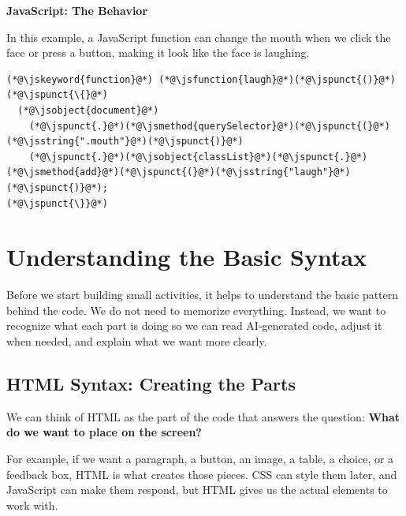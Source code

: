 \documentclass{article}
\begin{document}
\hfill
\begin{minipage}[t]{0.31\textwidth}
  \textbf{\Bitter\textcolor{naranja}{JavaScript: The Behavior}}

  \vspace{0.15cm}

  In this example, a JavaScript function can change the mouth when we click the face or press a button, making it look like the face is laughing.

  \vspace{0.2cm}

  \begin{lstlisting}
(*@\jskeyword{function}@*) (*@\jsfunction{laugh}@*)(*@\jspunct{()}@*) (*@\jspunct{\{}@*)
  (*@\jsobject{document}@*)
    (*@\jspunct{.}@*)(*@\jsmethod{querySelector}@*)(*@\jspunct{(}@*)(*@\jsstring{".mouth"}@*)(*@\jspunct{)}@*)
    (*@\jspunct{.}@*)(*@\jsobject{classList}@*)(*@\jspunct{.}@*)(*@\jsmethod{add}@*)(*@\jspunct{(}@*)(*@\jsstring{"laugh"}@*)(*@\jspunct{)}@*);
(*@\jspunct{\}}@*)
\end{lstlisting}

\end{minipage}

\vspace{0.7cm}

\section*{\Bitter\textcolor{naranja}{Understanding the Basic Syntax}}
\label{sec:basic-syntax}

Before we start building small activities, it helps to understand the basic pattern behind the code.
We do not need to memorize everything. Instead, we want to recognize what each part is doing so we can read AI-generated code, adjust it when needed, and explain what we want more clearly.

\vspace{0.3cm}

\subsection*{\Bitter\textcolor{naranja}{HTML Syntax: Creating the Parts}}
\label{subsec:html-syntax}

We can think of HTML as the part of the code that answers the question:
\textbf{What do we want to place on the screen?}

For example, if we want a paragraph, a button, an image, a table, a choice, or a feedback box, HTML is what creates those pieces.
CSS can style them later, and JavaScript can make them respond, but HTML gives us the actual elements to work with.
\end{document}

